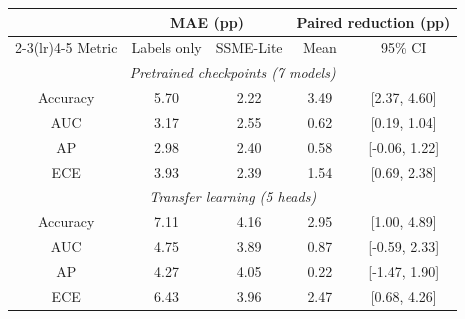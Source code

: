 \renewcommand{\arraystretch}{1.08}
\begin{tabular*}{\textwidth}{@{\extracolsep{\fill}}ccccc@{}}
\toprule
 & \multicolumn{2}{c}{MAE (pp)} & \multicolumn{2}{c}{Paired reduction (pp)} \\
\cmidrule(lr){2-3}\cmidrule(lr){4-5}
Metric & Labels only & SSME-Lite & Mean & 95\% CI \\
\midrule
\multicolumn{5}{c}{\textit{Pretrained checkpoints (7 models)}} \\
Accuracy & 5.70 & 2.22 & 3.49 & [2.37, 4.60] \\
AUC & 3.17 & 2.55 & 0.62 & [0.19, 1.04] \\
AP & 2.98 & 2.40 & 0.58 & [-0.06, 1.22] \\
ECE & 3.93 & 2.39 & 1.54 & [0.69, 2.38] \\
\midrule
\multicolumn{5}{c}{\textit{Transfer learning (5 heads)}} \\
Accuracy & 7.11 & 4.16 & 2.95 & [1.00, 4.89] \\
AUC & 4.75 & 3.89 & 0.87 & [-0.59, 2.33] \\
AP & 4.27 & 4.05 & 0.22 & [-1.47, 1.90] \\
ECE & 6.43 & 3.96 & 2.47 & [0.68, 4.26] \\
\bottomrule
\end{tabular*}